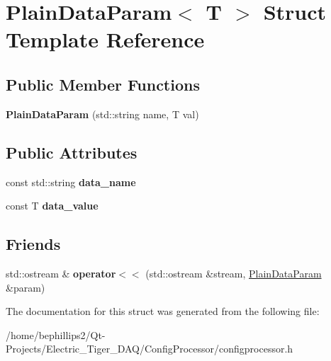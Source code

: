 \hypertarget{struct_plain_data_param}{}\section{Plain\+Data\+Param$<$ T $>$ Struct Template Reference}
\label{struct_plain_data_param}
\subsection*{Public Member Functions}
\begin{DoxyCompactItemize}
\item 
{\bfseries Plain\+Data\+Param} (std\+::string name, T val)\hypertarget{struct_plain_data_param_a794c26a7b671bb3c3ef52e7c7ba447a5}{}\label{struct_plain_data_param_a794c26a7b671bb3c3ef52e7c7ba447a5}

\end{DoxyCompactItemize}
\subsection*{Public Attributes}
\begin{DoxyCompactItemize}
\item 
const std\+::string {\bfseries data\+\_\+name}\hypertarget{struct_plain_data_param_a2376eb9c88951f9648048b4d8c46968b}{}\label{struct_plain_data_param_a2376eb9c88951f9648048b4d8c46968b}

\item 
const T {\bfseries data\+\_\+value}\hypertarget{struct_plain_data_param_a725d21ff8568129d46a516944b83ca6a}{}\label{struct_plain_data_param_a725d21ff8568129d46a516944b83ca6a}

\end{DoxyCompactItemize}
\subsection*{Friends}
\begin{DoxyCompactItemize}
\item 
std\+::ostream \& {\bfseries operator$<$$<$} (std\+::ostream \&stream, \hyperlink{struct_plain_data_param}{Plain\+Data\+Param} \&param)\hypertarget{struct_plain_data_param_a72df40b826bf228821a4f0e488fde836}{}\label{struct_plain_data_param_a72df40b826bf228821a4f0e488fde836}

\end{DoxyCompactItemize}


The documentation for this struct was generated from the following file\+:\begin{DoxyCompactItemize}
\item 
/home/bephillips2/\+Qt-\/\+Projects/\+Electric\+\_\+\+Tiger\+\_\+\+D\+A\+Q/\+Config\+Processor/configprocessor.\+h\end{DoxyCompactItemize}
